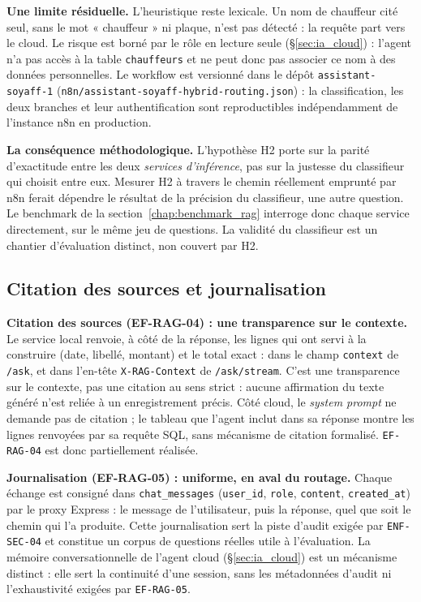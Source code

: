 \textbf{Une limite résiduelle.} L'heuristique reste lexicale. Un nom de chauffeur cité seul, sans le mot « chauffeur » ni plaque, n'est pas détecté : la requête part vers le cloud. Le risque est borné par le rôle en lecture seule (\S\ref{sec:ia_cloud}) : l'agent n'a pas accès à la table \texttt{chauffeurs} et ne peut donc pas associer ce nom à des données personnelles. Le workflow est versionné dans le dépôt \texttt{assistant-soyaff-1} (\texttt{n8n/assistant-soyaff-hybrid-routing.json}) : la classification, les deux branches et leur authentification sont reproductibles indépendamment de l'instance n8n en production.

\textbf{La conséquence méthodologique.} L'hypothèse H2 porte sur la parité d'exactitude entre les deux \emph{services d'inférence}, pas sur la justesse du classifieur qui choisit entre eux. Mesurer H2 à travers le chemin réellement emprunté par n8n ferait dépendre le résultat de la précision du classifieur, une autre question. Le benchmark de la section~\ref{chap:benchmark_rag} interroge donc chaque service directement, sur le même jeu de questions. La validité du classifieur est un chantier d'évaluation distinct, non couvert par H2.

\subsection{Citation des sources et journalisation}
\label{sec:ia_tracabilite}

\textbf{Citation des sources (EF-RAG-04) : une transparence sur le contexte.} Le service local renvoie, à côté de la réponse, les lignes qui ont servi à la construire (date, libellé, montant) et le total exact : dans le champ \texttt{context} de \texttt{/ask}, et dans l'en-tête \texttt{X-RAG-Context} de \texttt{/ask/stream}. C'est une transparence sur le contexte, pas une citation au sens strict : aucune affirmation du texte généré n'est reliée à un enregistrement précis. Côté cloud, le \textit{system prompt} ne demande pas de citation ; le tableau que l'agent inclut dans sa réponse montre les lignes renvoyées par sa requête SQL, sans mécanisme de citation formalisé. \texttt{EF-RAG-04} est donc partiellement réalisée.

\textbf{Journalisation (EF-RAG-05) : uniforme, en aval du routage.} Chaque échange est consigné dans \texttt{chat\_messages} (\texttt{user\_id}, \texttt{role}, \texttt{content}, \texttt{created\_at}) par le proxy Express : le message de l'utilisateur, puis la réponse, quel que soit le chemin qui l'a produite. Cette journalisation sert la piste d'audit exigée par \texttt{ENF-SEC-04} et constitue un corpus de questions réelles utile à l'évaluation. La mémoire conversationnelle de l'agent cloud (\S\ref{sec:ia_cloud}) est un mécanisme distinct : elle sert la continuité d'une session, sans les métadonnées d'audit ni l'exhaustivité exigées par \texttt{EF-RAG-05}.

